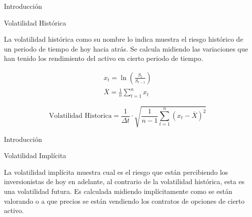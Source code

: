 \documentclass{beamer}
\begin{document}
\begin{frame}{Introducci\'on}

    \begin{block}{Volatilidad Hist\'orica}

    La volatilidad hist\'orica como su nombre lo indica muestra el riesgo hist\'orico
    de un periodo de tiempo de hoy hacia atr\'as. Se calcula midiendo las variaciones
    que han tenido los rendimiento del activo en cierto periodo de tiempo.

    \begin{eqnarray}
      x_t = \ln \left(\displaystyle\frac{S_t}{S_{t-1}}\right)
      \\
      \overline{X} = \displaystyle\frac{1}{n}\sum_{t=1}^{n} x_t
    \end{eqnarray}

    \begin{equation}
      \label{histo}
      \mbox{Volatilidad Historica} =\frac 1{\Delta t}\cdot  \sqrt{\displaystyle\frac{1}{n-1}\sum_{t=1}^{n} (x_t -\overline{X})^2} 
    \end{equation}

    \end{block}

\end{frame}

\begin{frame}{Introducci\'on}

    \begin{block}{Volatilidad Impl\'icita}

    La volatilidad impl\'icita muestra cual es el riesgo que est\'an percibiendo los
    inversionistas de hoy en adelante, al contrario de la volatilidad hist\'orica, esta
    es una volatilidad futura. Es calculada midiendo impl\'icitamente como se
    est\'an valorando o a que precios se est\'an vendiendo los contratos de opciones
    de cierto activo.

    \end{block}

\end{frame}
\end{document}
